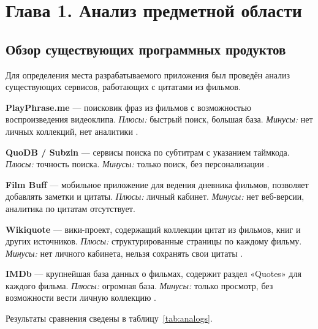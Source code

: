 \section*{Глава 1. Анализ предметной области}

\subsection{Обзор существующих программных продуктов}

Для определения места разрабатываемого приложения был проведён анализ существующих сервисов, 
работающих с цитатами из фильмов.

\textbf{PlayPhrase.me} — поисковик фраз из фильмов с возможностью воспроизведения видеоклипа.   			  \textit{Плюсы:} быстрый поиск, большая база. 					\textit{Минусы:} нет личных коллекций, нет аналитики \cite{playphrase}. 	 

\textbf{QuoDB / Subzin} — сервисы поиска по субтитрам с указанием таймкода.                                    \textit{Плюсы:} точность поиска.                             \textit{Минусы:} только поиск, без персонализации \cite{quodb}.  

\textbf{Film Buff} — мобильное приложение для ведения дневника фильмов, позволяет добавлять заметки и цитаты.  \textit{Плюсы:} личный кабинет. 								\textit{Минусы:} нет веб-версии, аналитика по цитатам отсутствует.

\textbf{Wikiquote} — вики-проект, содержащий коллекции цитат из фильмов, книг и других источников. 		       \textit{Плюсы:} структурированные страницы по каждому фильму. \textit{Минусы:} нет личного кабинета, нельзя сохранять свои цитаты \cite{wikiquote}. 	

\textbf{IMDb} — крупнейшая база данных о фильмах, содержит раздел «Quotes» для каждого фильма. 				  \textit{Плюсы:} огромная база. 								\textit{Минусы:} только просмотр, без возможности вести личную коллекцию \cite{imdb}. 

Результаты сравнения сведены в таблицу~\ref{tab:analogs}.

